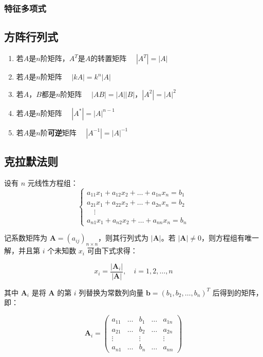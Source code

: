 \documentclass[a4paper,12pt]{article}
\begin{document}
    \subsubsection{特征多项式}

    \subsection{方阵行列式}

    \begin{enumerate}
        \item 若$A$是$n$阶矩阵，$A^T$是$A$的转置矩阵 \, \Rightarrow \, $|A^T| = |A|$
        \item 若$A$是$n$阶矩阵 \, \Rightarrow \, $|kA| = k^{n}|A|$
        \item 若$A$，$B$都是$n$阶矩阵 \, \Rightarrow \, $|AB| = |A||B|$，$|A^2| = |A|^2$
        \item 若$A$是$n$阶矩阵 \, \Rightarrow \, $|A^*| = |A|^{n-1}$
        \item 若$A$是$n$阶\textbf{可逆}矩阵 \, \Rightarrow \, $|A^{-1}| = |A|^{-1}$
    \end{enumerate}

    \subsection{克拉默法则}

    设有 $n$ 元线性方程组：
    \[
        \begin{cases}
            a_{11}x_1 + a_{12}x_2 + \dots + a_{1n}x_n = b_1 \\
            a_{21}x_1 + a_{22}x_2 + \dots + a_{2n}x_n = b_2 \\
            \quad \vdots \\
            a_{n1}x_1 + a_{n2}x_2 + \dots + a_{nn}x_n = b_n
        \end{cases}
    \]

    记系数矩阵为 $\mathbf{A} = (a_{ij})_{n\times n}$，则其行列式为 $|\mathbf{A}|$。若 $|\mathbf{A}| \neq 0$，则方程组有唯一解，并且第 $i$ 个未知数 $x_i$ 可由下式求得：

    \[
        x_i = \frac{|\mathbf{A}_i|}{|\mathbf{A}|}, \quad i=1,2,\dots,n
    \]

    其中 $\mathbf{A}_i$ 是将 $\mathbf{A}$ 的第 $i$ 列替换为常数列向量 $\mathbf{b} = (b_1, b_2, \dots, b_n)^T$ 后得到的矩阵，即：

    \[
        \mathbf{A}_i =
        \begin{pmatrix}
            a_{11} & \dots & b_1    & \dots & a_{1n} \\
            a_{21} & \dots & b_2    & \dots & a_{2n} \\
            \vdots &       & \vdots &       & \vdots \\
            a_{n1} & \dots & b_n    & \dots & a_{nn}
        \end{pmatrix}
    \]
\end{document}
